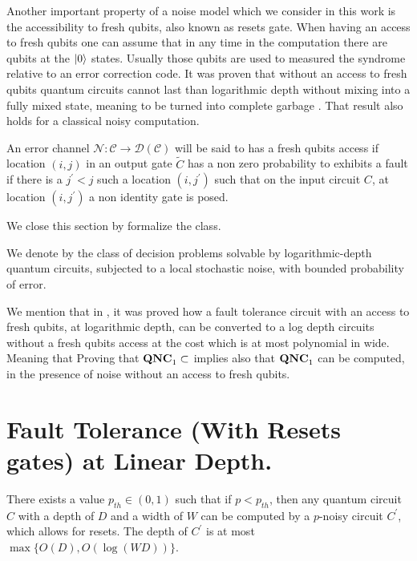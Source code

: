 \documentclass[manuscript,screen,review]{acmart}
\begin{document}
{Another important property of a noise model which we consider in this work is the accessibility to fresh qubits, also known as resets gate. When having an access to fresh qubits one can assume that in any time in the computation there are qubits at the $\ket{0}$ states. Usually those qubits are used to measured the syndrome relative to an error correction code. It was proven that without an access to fresh qubits quantum circuits cannot last than logarithmic depth without mixing into a fully mixed state, meaning to be turned into complete garbage \cite{aharonov1996limitationsnoisyreversiblecomputation}. That result also holds for a classical noisy computation. 

\begin{definition}
  An error channel $\mathcal{N}: \mathcal{C}\rightarrow \mathcal{D} \left( \mathcal{C} \right)$ will be said to has a fresh qubits access if location $(i,j)$ in an output gate $\tilde{C}$ has a non zero probability to exhibits a fault if there is a $j^{\prime} < j$ such a location $(i, j^{\prime})$ such that on the input circuit $C$, at location $(i,j^{\prime})$ a non identity gate is posed.     
\end{definition}

We close this section by formalize the \noiseQNCon class. 
\begin{definition}
  We denote by \noiseQNCon the class of decision problems solvable by logarithmic-depth quantum circuits, subjected to a local stochastic noise,  with bounded probability of error. 
\end{definition}
We mention that in \cite{aharonov1996limitationsnoisyreversiblecomputation}, it was proved how a fault tolerance circuit with an access to fresh qubits, at logarithmic depth, can be converted to a log depth circuits without a fresh qubits access at the cost which is at most polynomial in wide. Meaning that Proving that $ \mathbf{QNC}_{1} \subset $ \noiseQNCon implies also that $ \mathbf{QNC}_{1} $ can be computed, in the presence of noise without an access to fresh qubits. 

\section{ Fault Tolerance (With Resets gates) at Linear Depth. } 

\begin{claim}
There exists a value $p_{th} \in (0,1)$ such that if $p < p_{th}$, then any quantum circuit $C$ with a depth of $D$ and a width of $W$ can be computed by a $p$-noisy circuit $C^{\prime}$, which allows for resets. The depth of $C^{\prime}$ is at most $\max{ \{O(D), O(\log(WD)) \} }$.
\end{claim}


}
\end{document}
